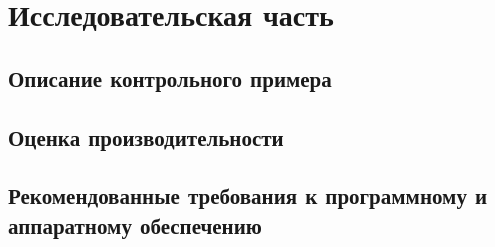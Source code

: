 \chapter{Исследовательская часть}

\section{Описание контрольного примера}
\section{Оценка производительности}
\section{Рекомендованные требования к программному и аппаратному обеспечению}

%
%

